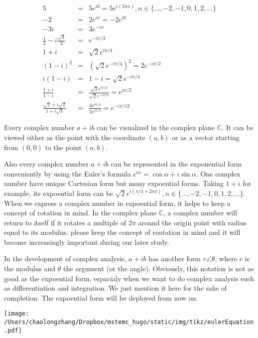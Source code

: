 \documentclass[koma,a4paper,utopia,12pt,listings-color,microtype,paralist,colorlinks,urlcolor=red]{org-article}
\begin{document}
\begin{eqnarray*}
 5 &=& 5 e^{i0} = 5 e^{i(2\pi n)}, n\in \{\ldots, -2,-1,0,1,2,\ldots \} \\
 -2 &=& 2 e^{i\pi} = -2 e^{i0} \\
 -3i &=& 3 e^{-i\pi} \\
 \tfrac{1}{2} - i \tfrac{\sqrt{3}}{2}  &=& e^{-i\pi/3} \\
 1+i &=& \sqrt{2} e^{i\pi/4} \\
 (1-i)^{2} &=& ( \sqrt{2} e^{-i\pi/4} )^{2} = 2 e^{-i\pi/2} \\
 i(1-i) &=& 1 - i = \sqrt{2} e^{-i\pi/4} \\
 \tfrac{1+i}{1-i} &=& \tfrac{ \sqrt{2}e^{i\pi/4} } { \sqrt{2}e^{-i\pi/4} } = e^{i\pi/2} \\
 \tfrac{\sqrt{2} + i \sqrt{2}}{1+i\sqrt{3}} &=& \tfrac{ 2e^{i\pi/4} }{ 2 e^{i\pi/3} } = e^{-i\pi/12}
\end{eqnarray*}


Every complex number \(a+ib\) can be visualized in the complex plane
\(\mathbb{C}\). It can be viewed either as the point with the coordinate
\((a,b)\) or as a vector starting from \(( 0,0 )\) to the point \((a,b)\).

Also every complex number \(a+ib\) can be represented in the exponential form
conveniently by using the Euler's formula \(e^{i\alpha} = \cos\alpha +
 i\sin\alpha\). One complex number have unique Cartesian form but many
expoential forms. Taking \(1+i\) for example, its expoential form can be
\(\sqrt{2}e^{i(\pi/4 + 2n\pi)}, n\in \{ \ldots, -2,-1,0,1,2,\ldots \}\). When
we express a complex number in expoential form, it helps to keep a concept of
rotation in mind. In the complex plane \(\mathbb{C}\), a complex number will
return to itself if it rotates a multiple of \(2\pi\) around the origin point
with radius equal to its modulus. please keep the concept of roatation in mind
and it will become increasingly important during our later study.

In the development of complex analysis, \(a+ib\) has another form \(r\angle
 \theta\), where \(r\) is the modulus and \(\theta\) the argument (or the
angle). Obviously, this notation is not as good as the expoential form,
espacialy when we want to do complex analysis such as differentiation and
integration. We just mention it here for the sake of completion. The expoential
form will be deployed from now on.


\begin{center}
\texttt{[image: /Users/chaolongzhang/Dropbox/mstemc\_hugo/static/img/tikz/eulerEquation.pdf]}
\end{center}
\end{document}
